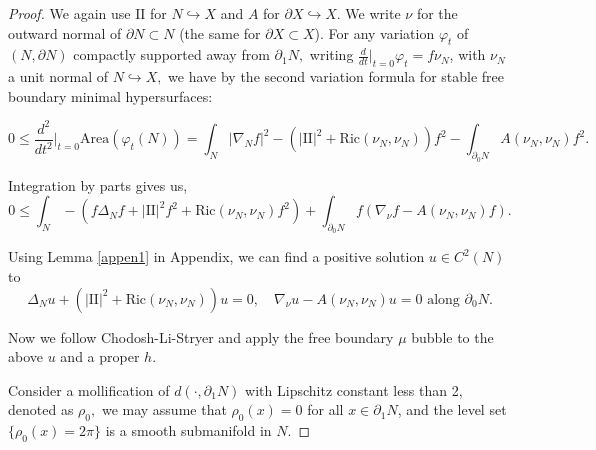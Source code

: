 \documentclass[12pt]{amsart}
\newcommand{\sff}{\mathrm{I\!I}}
\newcommand{\Ric}{\text{Ric}}
\numberwithin{equation}{section}
\begin{document}
	\begin{proof}

		We again use $\sff$ for $N\hookrightarrow X $ and $A$ for $\partial X \hookrightarrow X$. We write  $\nu$ for the outward normal of $\partial N \subset N$ (the same for $\partial X \subset X$). 
		For any variation $\varphi_t$ of $(N,\partial N)$ compactly supported away from $\partial_1 N,$ writing $\frac{d}{dt} \big|_{t=0} \varphi_t= f\nu_{N} $, with $\nu_N$  a unit normal of $N \hookrightarrow X,$ we have by the second variation formula for stable free boundary minimal hypersurfaces:

		\begin{equation*}
			0\leq \frac{d^2}{dt^2}\big|_{t=0} \text{Area}(\varphi_t(N))=\int_N |\nabla_N f|^2 -(|\sff|^2+\Ric(\nu_N,\nu_N) )f^2-\int_{\partial_0 N} A(\nu_N,\nu_N)f^2.
		\end{equation*}


		Integration by parts gives us,
		\begin{equation*}
			0\leq \int_N-(f\Delta_N f+|\sff|^2f^2+\Ric(\nu_N,\nu_N)f^2) + \int_{\partial_0 N} f(\nabla_{\nu}f-A(\nu_N,\nu_N)f).
		\end{equation*}

		Using Lemma \ref{appen1} in Appendix, we can find a positive solution $u\in C^2(N)$ to $$\Delta_N u+(|\sff|^2+\Ric(\nu_N,\nu_N))u=0, \quad \nabla_{\nu}u-A(\nu_N,\nu_N)u=0 \text{ along } \partial_0 N.$$

		Now we follow Chodosh-Li-Stryer \cite{ChodoLiStryk2022-CompleteStableMinimal} and apply the free boundary $\mu$ bubble to the above $u$ and a proper $h$. 

		Consider a mollification of $d(\cdot,\partial_1 N)$ with Lipschitz constant less than 2, denoted as $\rho_0,$ 
		we may assume that $\rho_0(x)=0$ for all $x\in \partial_1 N$, and the level set $\{\rho_0(x)=2\pi\}$ is a smooth submanifold in $N$.
		


\end{proof}
\end{document}

